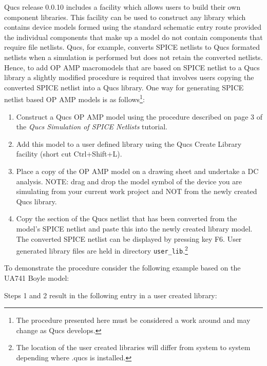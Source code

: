 Qucs release 0.0.10 includes a facility which allows users to build their own component libraries. This facility can be used to construct any library which contains device models formed using the standard schematic entry route provided the individual components that make up a model do not contain components that require file netlists.  Qucs, for example, converts SPICE netlists to Qucs formated netlists when a  simulation is performed but does not retain the converted netlists. Hence, to add OP AMP macromodels that are based on SPICE netlist to a Qucs library a slightly modified procedure is required that involves users copying the converted SPICE netlist into a Qucs library.  One way for generating SPICE netlist based OP AMP models is as follows\footnote{The procedure presented here must be considered a work around and may change as Qucs develops.}:
\begin{enumerate}
 \item Construct a Qucs OP AMP model using the procedure described on page 3 of the \textit{Qucs Simulation of SPICE Netlists} tutorial.
 \item Add this model to a user defined library using the Qucs Create Library facility (short cut Ctrl+Shift+L).
 \item Place a copy of the OP AMP model on a drawing sheet and undertake a DC analysis. NOTE: drag and drop the model symbol of the device you are simulating from your current work project and NOT from the newly created Qucs library.
 \item Copy the section of the Qucs netlist that has been converted from the model's SPICE netlist and paste this into the newly created library model. The converted SPICE netlist can be displayed by pressing key F6. User generated library files are held in directory \verb|user_lib|.\footnote{The location of the user created libraries will differ from system to system depending where .qucs is installed.}
\end{enumerate}

 To demonstrate the procedure consider the following example based on the UA741 Boyle model:

 Steps 1 and 2 result in the following entry in a user created library:

